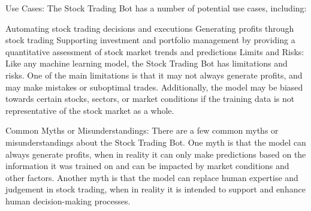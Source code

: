 Use Cases:
The Stock Trading Bot has a number of potential use cases, including:

Automating stock trading decisions and executions
Generating profits through stock trading
Supporting investment and portfolio management by providing a quantitative assessment of stock market trends and predictions
Limits and Risks:
Like any machine learning model, the Stock Trading Bot has limitations and risks. One of the main limitations is that it may not always generate profits, and may make mistakes or suboptimal trades. Additionally, the model may be biased towards certain stocks, sectors, or market conditions if the training data is not representative of the stock market as a whole.

Common Myths or Misunderstandings:
There are a few common myths or misunderstandings about the Stock Trading Bot. One myth is that the model can always generate profits, when in reality it can only make predictions based on the information it was trained on and can be impacted by market conditions and other factors. Another myth is that the model can replace human expertise and judgement in stock trading, when in reality it is intended to support and enhance human decision-making processes.

